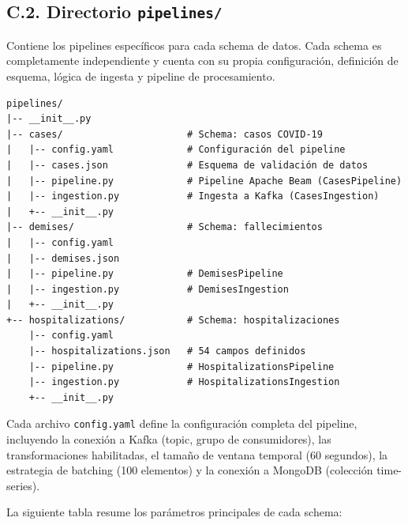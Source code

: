 \documentclass[12pt,a4paper]{article}
\begin{document}
\subsection*{C.2. Directorio \texttt{pipelines/}}

Contiene los pipelines específicos para cada schema de datos. Cada schema es completamente independiente y cuenta con su propia configuración, definición de esquema, lógica de ingesta y pipeline de procesamiento.

\begin{verbatim}
pipelines/
|-- __init__.py
|-- cases/                      # Schema: casos COVID-19
|   |-- config.yaml             # Configuración del pipeline
|   |-- cases.json              # Esquema de validación de datos
|   |-- pipeline.py             # Pipeline Apache Beam (CasesPipeline)
|   |-- ingestion.py            # Ingesta a Kafka (CasesIngestion)
|   +-- __init__.py
|-- demises/                    # Schema: fallecimientos
|   |-- config.yaml
|   |-- demises.json
|   |-- pipeline.py             # DemisesPipeline
|   |-- ingestion.py            # DemisesIngestion
|   +-- __init__.py
+-- hospitalizations/           # Schema: hospitalizaciones
    |-- config.yaml
    |-- hospitalizations.json   # 54 campos definidos
    |-- pipeline.py             # HospitalizationsPipeline
    |-- ingestion.py            # HospitalizationsIngestion
    +-- __init__.py
\end{verbatim}

Cada archivo \texttt{config.yaml} define la configuración completa del pipeline, incluyendo la conexión a Kafka (topic, grupo de consumidores), las transformaciones habilitadas, el tamaño de ventana temporal (60 segundos), la estrategia de batching (100 elementos) y la conexión a MongoDB (colección time-series).

La siguiente tabla resume los parámetros principales de cada schema:
\end{document}
